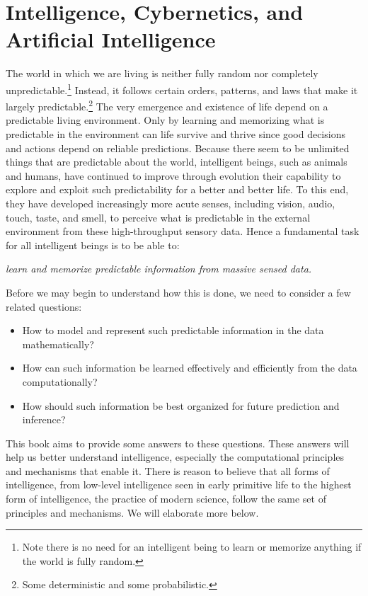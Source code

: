 \documentclass[../../book-main.tex]{subfiles}
\begin{document}
\section{Intelligence, Cybernetics, and Artificial Intelligence}
The world in which we are living is neither fully random nor completely unpredictable.\footnote{Note there is no need for an intelligent being to learn or memorize anything if the world is fully random.} Instead, it follows certain orders, patterns, and laws that make it largely predictable.\footnote{Some deterministic and some probabilistic.} The very emergence and existence of life depend on a predictable living environment. Only by learning and memorizing what is predictable in the environment can life survive and thrive since good decisions and actions depend on reliable predictions. Because there seem to be unlimited things that are predictable about the world, intelligent beings, such as animals and humans, have continued to improve through evolution their capability to explore and exploit such predictability for a better and better life. To this end, they have developed increasingly more acute senses, including vision, audio, touch, taste, and smell, to perceive what is predictable in the external environment from these high-throughput sensory data. Hence a fundamental task for all intelligent beings is to be able to:
\begin{center}
    {\em learn and memorize predictable information from massive sensed data.}
\end{center}
Before we may begin to understand how this is done, we need to consider a few related questions:
\begin{itemize}
    \item How to model and represent such predictable information in the data mathematically?
    \item How can such information be learned effectively and efficiently from the data computationally?
    \item How should such information be best organized for future prediction and inference?
\end{itemize}
This book aims to provide some answers to these questions. These answers will help us better understand intelligence, especially the computational principles and mechanisms that enable it. There is reason to believe that all forms of intelligence, from low-level intelligence seen in early primitive life to the highest form of intelligence, the practice of modern science, follow the same set of principles and mechanisms. We will elaborate more below.
\end{document}
